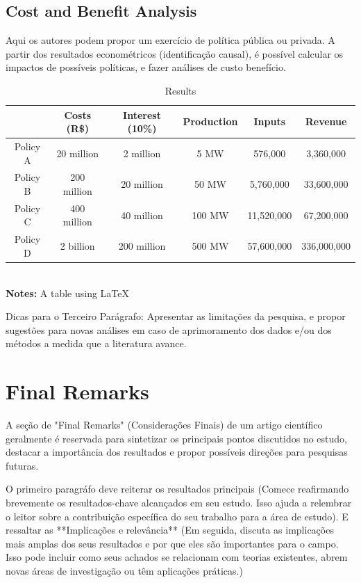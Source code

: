 \documentclass[a4paper]{article}
\begin{document}
\subsection{Cost and Benefit Analysis}

Aqui os autores podem propor um exercício de política pública ou privada. A partir dos resultados econométricos (identificação causal), é possível calcular os impactos de possíveis políticas, e fazer análises de custo benefício.


\begin{table}[h]
      \centering
      \caption{Results}
      \begin{tabular}{cccccc}
          \toprule
          & Costs (R\$) & Interest (10\%) & Production & Inputs & Revenue \\
          \midrule
          Policy A & 20 million & 2 million & 5 MW & 576,000 & 3,360,000 \\
          Policy B & 200 million & 20 million & 50 MW & 5,760,000 & 33,600,000 \\
          Policy C & 400 million & 40 million & 100 MW & 11,520,000 & 67,200,000 \\
          Policy D & 2 billion & 200 million & 500 MW & 57,600,000 & 336,000,000 \\
          \bottomrule
      \end{tabular} \\
      \textbf{Notes:} A table using LaTeX
\end{table}

Dicas para o Terceiro Parágrafo: Apresentar as limitações da pesquisa, e propor sugestões para novas análises em caso de aprimoramento dos dados e/ou dos métodos a medida que a literatura avance.

\section{Final Remarks}

A seção de "Final Remarks" (Considerações Finais) de um artigo científico geralmente é reservada para sintetizar os principais pontos discutidos no estudo, destacar a importância dos resultados e propor possíveis direções para pesquisas futuras. 

O primeiro paragráfo deve reiterar os resultados principais (Comece reafirmando brevemente os resultados-chave alcançados em seu estudo. Isso ajuda a relembrar o leitor sobre a contribuição específica do seu trabalho para a área de estudo). E ressaltar as **Implicações e relevância** (Em seguida, discuta as implicações mais amplas dos seus resultados e por que eles são importantes para o campo. Isso pode incluir como seus achados se relacionam com teorias existentes, abrem novas áreas de investigação ou têm aplicações práticas.)
\end{document}
